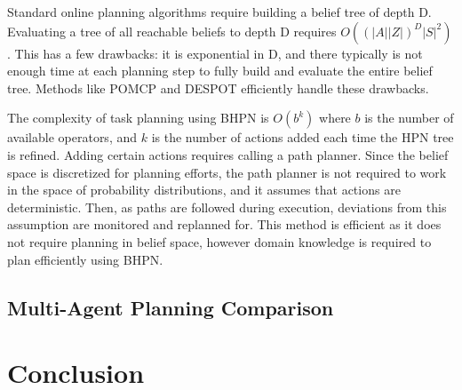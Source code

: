 \documentclass[12pt]{article}
\begin{document}
Standard online planning algorithms require building a belief tree of depth D. Evaluating a tree of all reachable beliefs to depth D requires $O((|A||Z|)^{D}|S|^{2})$. This has a few drawbacks: it is exponential in D, and there typically is not enough time at each planning step to fully build and evaluate the entire belief tree. Methods like POMCP and DESPOT efficiently handle these drawbacks.

The complexity of task planning using BHPN is $O(b^{k})$ where $b$ is the number of available operators, and $k$ is the number of actions added each time the HPN tree is refined. Adding certain actions requires calling a path planner. Since the belief space is discretized for planning efforts, the path planner is not required to work in the space of probability distributions, and it assumes that actions are deterministic. Then, as paths are followed during execution, deviations from this assumption are monitored and replanned for. This method is efficient as it does not require planning in belief space, however domain knowledge is required to plan efficiently using BHPN.

\subsection{Multi-Agent Planning Comparison}

\section{Conclusion}



\end{document}
